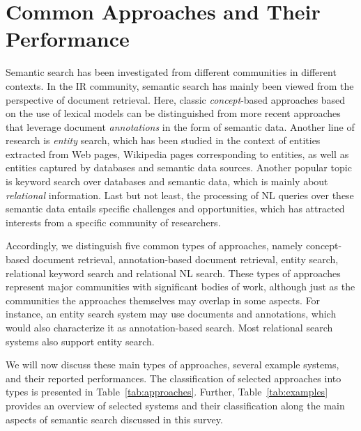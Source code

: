 \section{Common Approaches and Their Performance}\label{sec:approaches}	
Semantic search has been investigated from different communities in different contexts. In the IR community, semantic search has mainly been viewed from the perspective of document retrieval. Here, classic \emph{concept}-based approaches based on the use of lexical models can be distinguished from more recent approaches that leverage document \emph{annotations} in the form of semantic data. Another line of research is \emph{entity} search, which has been studied in the context of entities extracted from Web pages, Wikipedia pages corresponding to entities, as well as entities captured by databases and semantic data sources. Another popular topic is keyword search over databases and semantic data, which is mainly about \emph{relational} information. Last but not least, the processing of NL queries over these semantic data entails specific challenges and opportunities, which has attracted interests from a specific community of researchers. 

Accordingly, we distinguish five common types of approaches, namely concept-based document retrieval, annotation-based document retrieval, entity search, relational keyword search and relational NL search. These types of approaches represent major communities with significant bodies of work, although just as the communities the approaches themselves may overlap in some aspects. For instance, an entity search system may use documents and annotations, which would also characterize it as annotation-based search. Most relational search systems also support entity search.  

We will now discuss these main types of approaches, several example systems, and their reported performances. The classification of selected approaches into types is presented in Table~\ref{tab:approaches}. Further, Table~\ref{tab:examples} provides an overview of selected systems and their classification along the main aspects of semantic search discussed in this survey. 



